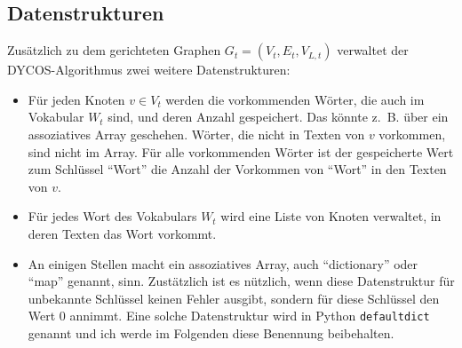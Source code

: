 \subsection{Datenstrukturen}
Zusätzlich zu dem gerichteten Graphen $G_t = (V_t, E_t, V_{L,t})$ 
verwaltet der DYCOS-Algorithmus zwei weitere Datenstrukturen:
\begin{itemize}
    \item Für jeden Knoten $v \in V_t$ werden die vorkommenden Wörter,
          die auch im Vokabular $W_t$ sind,
          und deren Anzahl gespeichert. Das könnte z.~B. über ein 
          assoziatives Array geschehen. Wörter, die nicht in 
          Texten von $v$ vorkommen, sind nicht im Array. Für
          alle vorkommenden Wörter ist der gespeicherte Wert zum 
          Schlüssel \enquote{Wort} die Anzahl der Vorkommen von 
          \enquote{Wort} in den Texten von $v$.
    \item Für jedes Wort des Vokabulars $W_t$ wird eine Liste von 
          Knoten verwaltet, in deren Texten das Wort vorkommt.
    \item An einigen Stellen macht ein assoziatives Array, auch 
          \enquote{dictionary} oder \enquote{map} genannt, sinn.
          Zustätzlich ist es nützlich, wenn diese Datenstruktur für 
          unbekannte Schlüssel keinen Fehler ausgibt, sondern für diese
          Schlüssel den Wert 0 annimmt. Eine solche Datenstruktur
          wird in Python \texttt{defaultdict} genannt und ich werde
          im Folgenden diese Benennung beibehalten.
\end{itemize}



